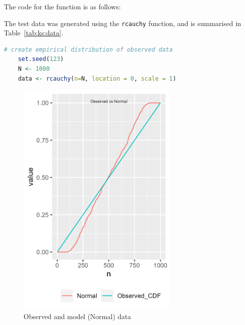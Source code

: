 \documentclass[12pt,letterpaper]{article}
\begin{document}

  The code for the function is as follows:

  

  The test data was generated using the \texttt{rcauchy} function, and is  summarised in Table~\ref{tab:ks:data}.
	\begin{lstlisting}[language=R]
	# create empirical distribution of observed data
	set.seed(123)
	N <- 1000
	data <- rcauchy(n=N, location = 0, scale = 1)

	\end{lstlisting}

  

  \begin{figure}[htb!]
	  \includegraphics[width=0.7\textwidth]{graphics/kolmogorov_smirnov.png}
	  \caption{Observed and model (Normal) data}
	  \label{fig:ks:data}
	\end{figure}
	\clearpage
\end{document}
